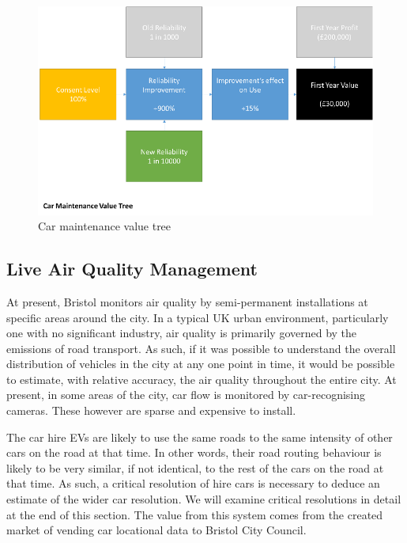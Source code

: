 \documentclass[conference]{IEEEtran}
\begin{document}
\begin{figure}[!htp]
\centering
\includegraphics[width=\columnwidth]{images/carmaintenancevt.png}
\caption{Car maintenance value tree}
\label{fig:carmaintenancevt}
\end{figure}


\subsection{Live Air Quality Management}

At present, Bristol monitors air quality by semi-permanent
installations at specific areas around the city.  In a typical UK
urban environment, particularly one with no significant industry, air
quality is primarily governed by the emissions of road transport.  As
such, if it was possible to understand the overall distribution of
vehicles in the city at any one point in time, it would be possible to
estimate, with relative accuracy, the air quality throughout the
entire city. At present, in some areas of the city, car flow is
monitored by car-recognising cameras. These however are sparse and
expensive to install.

The car hire EVs are likely to use the same roads to the same
intensity of other cars on the road at that time. In other words,
their road routing behaviour is likely to be very similar, if not
identical, to the rest of the cars on the road at that time. As such,
a critical resolution of hire cars is necessary to deduce an estimate
of the wider car resolution. We will examine critical resolutions in
detail at the end of this section.  The value from this system comes
from the created market of vending car locational data to Bristol City
Council.
\end{document}
